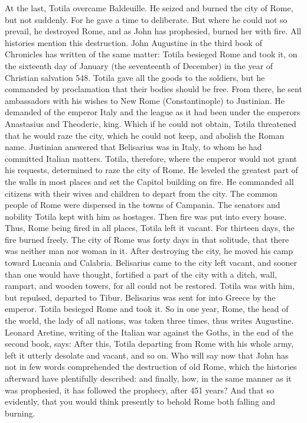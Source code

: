 At the last, Totila overcame Baldeuille. He seized and burned the city of Rome, but not suddenly. For he gave a time to deliberate. But where he could not so prevail, he destroyed Rome, and as John has prophesied, burned her with fire. All histories mention this destruction. John Augustine in the third book of Chronicles has written of the same matter: Totila besieged Rome and took it, on the sixteenth day of January (the seventeenth of December) in the year of Christian salvation 548. Totila gave all the goods to the soldiers, but he commanded by proclamation that their bodies should be free. From there, he sent ambassadors with his wishes to New Rome (Constantinople) to Justinian. He demanded of the emperor Italy and the league as it had been under the emperors Anastasius and Theoderic, king. Which if he could not obtain, Totila threatened that he would raze the city, which he could not keep, and abolish the Roman name. Justinian answered that Belisarius was in Italy, to whom he had committed Italian matters. Totila, therefore, where the emperor would not grant his requests, determined to raze the city of Rome. He leveled the greatest part of the walls in most places and set the Capitol building on fire. He commanded all citizens with their wives and children to depart from the city. The common people of Rome were dispersed in the towns of Campania. The senators and nobility Totila kept with him as hostages. Then fire was put into every house. Thus, Rome being fired in all places, Totila left it vacant. For thirteen days, the fire burned freely. The city of Rome was forty days in that solitude, that there was neither man nor woman in it. After destroying the city, he moved his camp toward Lucania and Calabria. Belisarius came to the city left vacant, and sooner than one would have thought, fortified a part of the city with a ditch, wall, rampart, and wooden towers, for all could not be restored. Totila was with him, but repulsed, departed to Tibur. Belisarius was sent for into Greece by the emperor. Totila besieged Rome and took it. So in one year, Rome, the head of the world, the lady of all nations, was taken three times, thus writes Augustine. Leonard Aretine, writing of the Italian war against the Goths, in the end of the second book, says: After this, Totila departing from Rome with his whole army, left it utterly desolate and vacant, and so on. Who will say now that John has not in few words comprehended the destruction of old Rome, which the histories afterward have plentifully described: and finally, how, in the same manner as it was prophesied, it has followed the prophecy, after 451 years? And that so evidently, that you would think presently to behold Rome both falling and burning.

